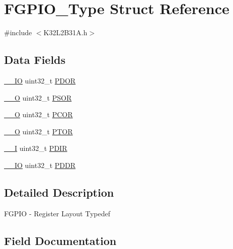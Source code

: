 \hypertarget{struct_f_g_p_i_o___type}{}\section{F\+G\+P\+I\+O\+\_\+\+Type Struct Reference}
\label{struct_f_g_p_i_o___type}


{\ttfamily \#include $<$K32\+L2\+B31\+A.\+h$>$}

\subsection*{Data Fields}
\begin{DoxyCompactItemize}
\item 
\mbox{\hyperlink{core__cm0plus_8h_aec43007d9998a0a0e01faede4133d6be}{\+\_\+\+\_\+\+IO}} uint32\+\_\+t \mbox{\hyperlink{struct_f_g_p_i_o___type_aef77a53fb6962f329978c788b3c1e637}{P\+D\+OR}}
\item 
\mbox{\hyperlink{core__cm0plus_8h_a7e25d9380f9ef903923964322e71f2f6}{\+\_\+\+\_\+O}} uint32\+\_\+t \mbox{\hyperlink{struct_f_g_p_i_o___type_a3aa2323e3b596f8c9f191acb2ad7f75d}{P\+S\+OR}}
\item 
\mbox{\hyperlink{core__cm0plus_8h_a7e25d9380f9ef903923964322e71f2f6}{\+\_\+\+\_\+O}} uint32\+\_\+t \mbox{\hyperlink{struct_f_g_p_i_o___type_ac53cb29f8a090565bec5e94b6b808572}{P\+C\+OR}}
\item 
\mbox{\hyperlink{core__cm0plus_8h_a7e25d9380f9ef903923964322e71f2f6}{\+\_\+\+\_\+O}} uint32\+\_\+t \mbox{\hyperlink{struct_f_g_p_i_o___type_a1c26bce9144a9606d3f8a60dc750b063}{P\+T\+OR}}
\item 
\mbox{\hyperlink{core__cm0plus_8h_af63697ed9952cc71e1225efe205f6cd3}{\+\_\+\+\_\+I}} uint32\+\_\+t \mbox{\hyperlink{struct_f_g_p_i_o___type_a1013b95ac09a1205ba0528ad32ad1edc}{P\+D\+IR}}
\item 
\mbox{\hyperlink{core__cm0plus_8h_aec43007d9998a0a0e01faede4133d6be}{\+\_\+\+\_\+\+IO}} uint32\+\_\+t \mbox{\hyperlink{struct_f_g_p_i_o___type_a441a96d3febd01d841b24561b4d036a3}{P\+D\+DR}}
\end{DoxyCompactItemize}


\subsection{Detailed Description}
F\+G\+P\+IO -\/ Register Layout Typedef 

\subsection{Field Documentation}
\mbox{\label{struct_f_g_p_i_o___type_ac53cb29f8a090565bec5e94b6b808572}} 
